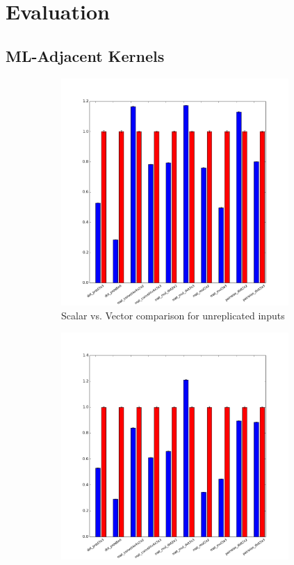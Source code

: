 \section{Evaluation}\label{sec:eval}
\subsection{ML-Adjacent Kernels}
\begin{figure}
    \begin{subfigure}{0.3\textwidth}
        \includegraphics[width=0.95\textwidth]{figures/graphs/DataUnreplicatedENC+RUN.png}
        \caption{Scalar vs. Vector comparison for unreplicated inputs}\label{fig:ml-kernels-unrepl}
    \end{subfigure}
    \begin{subfigure}{0.3\textwidth}
        \includegraphics[width=0.95\textwidth]{figures/graphs/DataPartiallyReplicatedENC+RUN.png}

\end{subfigure}
\end{figure}
